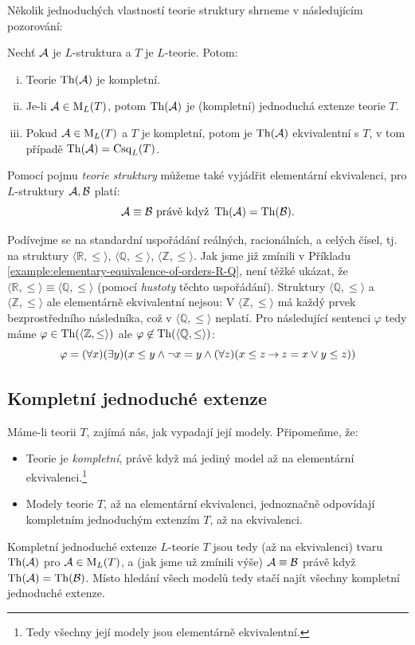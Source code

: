 Několik jednoduchých vlastností teorie struktury shrneme v následujícím pozorování:

\begin{observation}
    Nechť $\mathcal{A}$ je $L$-struktura a $T$ je $L$-teorie. Potom:
    \begin{enumerate}[(i)]
        \item Teorie $\operatorname{Th}(\mathcal{A})$ je kompletní.
        \item Je-li $\mathcal{A}\in\operatorname{M}_L(T)$, potom $\operatorname{Th}(\mathcal{A})$ je (kompletní) jednoduchá extenze teorie $T$.
        \item Pokud $\mathcal{A}\in\operatorname{M}_L(T)$ a $T$ je kompletní, potom je $\operatorname{Th}(\mathcal{A})$ ekvivalentní s $T$, v tom případě $\operatorname{Th}(\mathcal{A})=\operatorname{Csq}_L(T)$.
    \end{enumerate}    
\end{observation}

Pomocí pojmu \emph{teorie struktury} můžeme také vyjádřit elementární ekvivalenci, pro $L$-struktury $\mathcal{A},\mathcal{B}$ platí:
$$
\mathcal{A}\equiv\mathcal{B} \text{ právě když }\operatorname{Th}(\mathcal{A})=\operatorname{Th}(\mathcal{B}).
$$

\begin{example}
   Podívejme se na standardní uspořádání reálných, racionálních, a celých čísel, tj. na struktury $\langle\mathbb R,\leq\rangle$, $\langle\mathbb Q,\leq\rangle$, $\langle\mathbb Z,\leq\rangle$. Jak jsme již zmínili v Příkladu \ref{example:elementary-equivalence-of-orders-R-Q}, není těžké ukázat, že $\langle\mathbb R,\leq\rangle\equiv\langle\mathbb Q,\leq\rangle$ (pomocí \emph{hustoty} těchto uspořádání). Struktury $\langle\mathbb Q,\leq\rangle$ a $\langle\mathbb Z,\leq\rangle$ ale elementárně ekvivalentní nejsou: V $\langle\mathbb Z,\leq\rangle$ má každý prvek bezprostředního následníka, což v $\langle\mathbb Q,\leq\rangle$ neplatí. Pro následující sentenci $\varphi$ tedy máme $\varphi\in\operatorname{Th}(\langle\mathbb Z,\leq\rangle)$ ale $\varphi\not\in\operatorname{Th}(\langle\mathbb Q,\leq\rangle)$:
   $$
   \varphi=(\forall x)(\exists y)(x\leq y\land \neg x=y\land(\forall z)(x\leq z\mathbin{\rightarrow} z=x\lor y\leq z))
   $$
\end{example}


\subsection{Kompletní jednoduché extenze}

Máme-li teorii $T$, zajímá nás, jak vypadají její modely. Připomeňme, že:
\begin{itemize}
    \item Teorie je \emph{kompletní}, právě když má jediný model až na elementární ekvivalenci.\footnote{Tedy všechny její modely jsou elementárně ekvivalentní.}
    \item Modely teorie $T$, až na elementární ekvivalenci, jednoznačně odpovídají kompletním jednoduchým extenzím $T$, až na ekvivalenci.
\end{itemize}
Kompletní jednoduché extenze $L$-teorie $T$ jsou tedy (až na ekvivalenci) tvaru $\operatorname{Th}(\mathcal{A})$ pro $\mathcal{A}\in\operatorname{M}_L(T)$, a (jak jsme už zmínili výše) $\mathcal{A}\equiv\mathcal{B}$ právě když $\operatorname{Th}(\mathcal{A})=\operatorname{Th}(\mathcal{B})$. Místo hledání všech modelů tedy stačí najít všechny kompletní jednoduché extenze.

